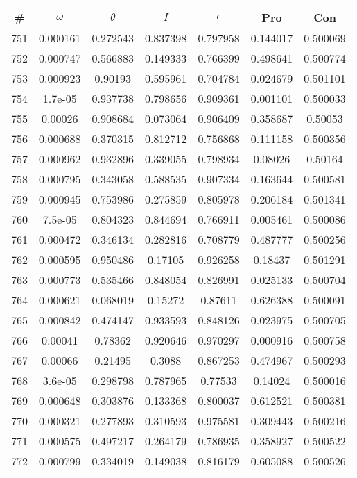 \newpage
\begin{table}
\begin{tabular}{c|c|c|c|c|c|c}
\# & $\omega$ & $\theta$ & $I$ & $\epsilon$ & Pro & Con\\
\hline
751 & 0.000161 & 0.272543 & 0.837398 & 0.797958 & 0.144017 & 0.500069\\
752 & 0.000747 & 0.566883 & 0.149333 & 0.766399 & 0.498641 & 0.500774\\
753 & 0.000923 & 0.90193 & 0.595961 & 0.704784 & 0.024679 & 0.501101\\
754 & 1.7e-05 & 0.937738 & 0.798656 & 0.909361 & 0.001101 & 0.500033\\
755 & 0.00026 & 0.908684 & 0.073064 & 0.906409 & 0.358687 & 0.50053\\
756 & 0.000688 & 0.370315 & 0.812712 & 0.756868 & 0.111158 & 0.500356\\
757 & 0.000962 & 0.932896 & 0.339055 & 0.798934 & 0.08026 & 0.50164\\
758 & 0.000795 & 0.343058 & 0.588535 & 0.907334 & 0.163644 & 0.500581\\
759 & 0.000945 & 0.753986 & 0.275859 & 0.805978 & 0.206184 & 0.501341\\
760 & 7.5e-05 & 0.804323 & 0.844694 & 0.766911 & 0.005461 & 0.500086\\
761 & 0.000472 & 0.346134 & 0.282816 & 0.708779 & 0.487777 & 0.500256\\
762 & 0.000595 & 0.950486 & 0.17105 & 0.926258 & 0.18437 & 0.501291\\
763 & 0.000773 & 0.535466 & 0.848054 & 0.826991 & 0.025133 & 0.500704\\
764 & 0.000621 & 0.068019 & 0.15272 & 0.87611 & 0.626388 & 0.500091\\
765 & 0.000842 & 0.474147 & 0.933593 & 0.848126 & 0.023975 & 0.500705\\
766 & 0.00041 & 0.78362 & 0.920646 & 0.970297 & 0.000916 & 0.500758\\
767 & 0.00066 & 0.21495 & 0.3088 & 0.867253 & 0.474967 & 0.500293\\
768 & 3.6e-05 & 0.298798 & 0.787965 & 0.77533 & 0.14024 & 0.500016\\
769 & 0.000648 & 0.303876 & 0.133368 & 0.800037 & 0.612521 & 0.500381\\
770 & 0.000321 & 0.277893 & 0.310593 & 0.975581 & 0.309443 & 0.500216\\
771 & 0.000575 & 0.497217 & 0.264179 & 0.786935 & 0.358927 & 0.500522\\
772 & 0.000799 & 0.334019 & 0.149038 & 0.816179 & 0.605088 & 0.500526\\

\end{tabular}
\end{table}
